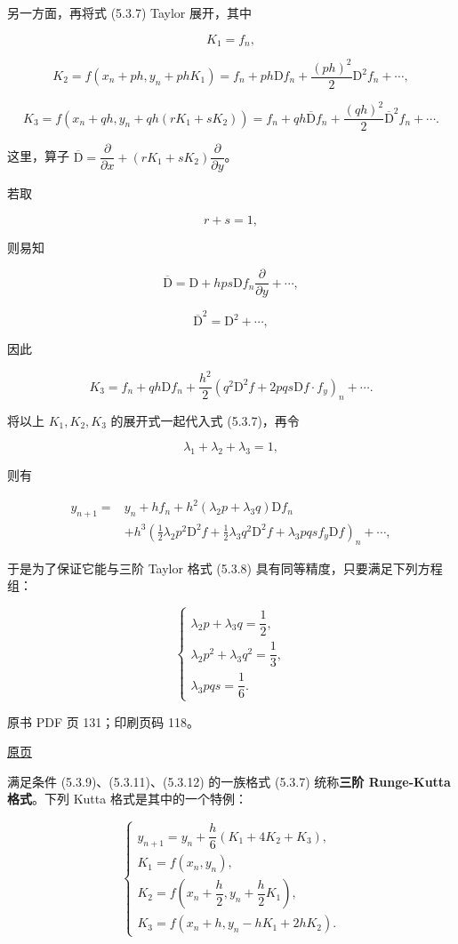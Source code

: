 另一方面，再将式 (5.3.7) Taylor 展开，其中

\[
K_1=f_n,
\]

\[
K_2=f(x_n+ph,y_n+phK_1)=f_n+ph\mathrm Df_n+\frac{(ph)^2}{2}\mathrm D^2f_n+\cdots,
\]

\[
K_3=f(x_n+qh,y_n+qh(rK_1+sK_2))=f_n+qh\overline{\mathrm D}f_n+\frac{(qh)^2}{2}\overline{\mathrm D}^{2}f_n+\cdots.
\]

这里，算子 \(\overline{\mathrm D}=\dfrac{\partial}{\partial x}+(rK_1+sK_2)\dfrac{\partial}{\partial y}\)。

若取

\[
r+s=1,\tag{5.3.9}
\]

则易知

\[
\overline{\mathrm D}=\mathrm D+hps\mathrm Df_n\frac{\partial}{\partial y}+\cdots,\tag{5.3.10}
\]

\[
\overline{\mathrm D}^{2}=\mathrm D^2+\cdots,
\]

因此

\[
K_3=f_n+qh\mathrm Df_n+\frac{h^2}{2}(q^2\mathrm D^2f+2pqs\mathrm Df\cdot f_y)_n+\cdots.
\]

将以上 \(K_1,K_2,K_3\) 的展开式一起代入式 (5.3.7)，再令

\[
\lambda_1+\lambda_2+\lambda_3=1,\tag{5.3.11}
\]

则有

\[
\begin{aligned}
y_{n+1}={}&y_n+hf_n+h^2(\lambda_2p+\lambda_3q)\mathrm Df_n\\
&+h^3\left(\frac12\lambda_2p^2\mathrm D^2f+\frac12\lambda_3q^2\mathrm D^2f+\lambda_3pqsf_y\mathrm Df\right)_n+\cdots,
\end{aligned}
\]

于是为了保证它能与三阶 Taylor 格式 (5.3.8) 具有同等精度，只要满足下列方程组：

\[
\begin{cases}
\lambda_2p+\lambda_3q=\dfrac12,\\
\lambda_2p^2+\lambda_3q^2=\dfrac13,\\
\lambda_3pqs=\dfrac16.
\end{cases}\tag{5.3.12}
\]

\clearpage

原书 PDF 页 131；印刷页码 118。

\href{source-images/pdf-131.jpeg}{原页}

满足条件 (5.3.9)、(5.3.11)、(5.3.12) 的一族格式 (5.3.7) 统称\textbf{三阶 Runge-Kutta 格式}。下列 Kutta 格式是其中的一个特例：

\[
\begin{cases}
y_{n+1}=y_n+\dfrac{h}{6}(K_1+4K_2+K_3),\\
K_1=f(x_n,y_n),\\
K_2=f\left(x_n+\dfrac{h}{2},y_n+\dfrac{h}{2}K_1\right),\\
K_3=f(x_n+h,y_n-hK_1+2hK_2).
\end{cases}
\]

